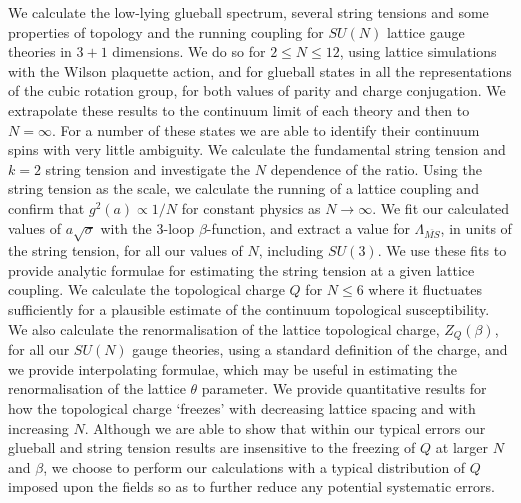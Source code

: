 \documentclass[12pt]{article}
\begin{document}
\begin{titlepage}
We calculate the low-lying glueball spectrum, several string tensions and some properties of
topology and the running coupling for $SU(N)$ lattice gauge theories in $3+1$ dimensions. We
do so for $2 \leq N \leq 12$, using lattice simulations with the Wilson plaquette action,
and for glueball states in all the representations of the cubic rotation group, for
both values of parity and charge conjugation. We extrapolate these results to
the continuum limit of each theory and then to $N=\infty$. For a number of these states
we are able to identify their continuum spins with very little ambiguity.
We calculate the fundamental string tension and $k=2$ string tension and investigate
the $N$ dependence of the ratio. Using the string tension as the scale, we calculate
the running of a lattice coupling and confirm that $g^2(a)\propto 1/N$  for
constant physics as $N\to\infty$. We fit our calculated values of $a\surd\sigma$
with the 3-loop $\beta$-function, and extract a value for $\Lambda_{\overline{MS}}$,
in units of the string tension, for all our values of $N$, including $SU(3)$. We use these
fits to provide analytic formulae for estimating the string tension at a given lattice coupling.
We calculate the topological charge $Q$ for $N\leq 6$ where it fluctuates
sufficiently for a plausible estimate of the continuum topological susceptibility.
We also calculate the renormalisation of the lattice topological charge, $Z_Q(\beta)$, for
all our $SU(N)$ gauge theories, using a standard definition of the charge, and we provide
interpolating formulae, which may be useful in estimating the renormalisation of
the lattice $\theta$ parameter. We provide quantitative results for how
the topological charge `freezes' with decreasing lattice spacing and with increasing $N$.
Although we are able to show that within our typical errors our glueball and string tension
results are insensitive to the freezing of $Q$ at larger $N$ and $\beta$, we choose to
perform our calculations with a typical distribution of $Q$ imposed upon the fields
so as to further reduce any potential systematic errors.


\vspace*{0.15in}



\end{titlepage}

\setcounter{page}{1}
\newpage
\pagestyle{plain}

\tableofcontents
\end{document}
